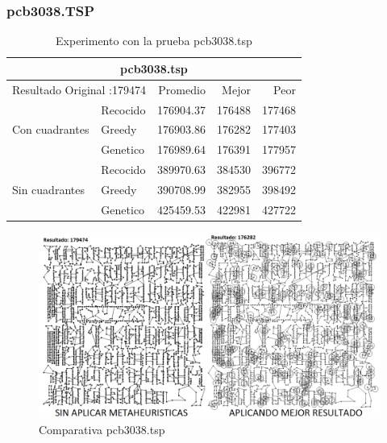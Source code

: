 \subsubsection{pcb3038.TSP}
\begin{table}[hbtp]
 \centering 
	\begin{tabular}{ | l   l | r | r | r |   }
         \hline\multicolumn{5}{|c|}{ \rowcolor[gray]{0.8}pcb3038.tsp} \\\hline
        \multicolumn{2}{|l|}{Resultado Original :179474}  & Promedio & Mejor & Peor \\ \hline
                        & Recocido  & 176904.37 & 176488 & 177468  \\ 
         Con cuadrantes & Greedy    & 176903.86 & 176282 & 177403  \\ 
                        & Genetico  & 176989.64 & 176391 & 177957  \\ \hline
                        & Recocido  & 389970.63 & 384530 & 396772   \\ 
         Sin cuadrantes & Greedy    & 390708.99 & 382955 & 398492   \\ 
                        & Genetico  & 425459.53 & 422981 & 427722   \\ \hline
    \end{tabular}
    \caption{Experimento con la prueba pcb3038.tsp}
    \label{table:EXP_pcb3038.tsp}
\end{table}
\begin{figure}[hbtp]
    \centering
        \includegraphics[width=1\textwidth]{PruebasResultados/Experimentos_Comparativas/pcb3038.png}
        \caption{Comparativa pcb3038.tsp}
        \label{fig:pcb3038_comparativa.png}
\end{figure}
